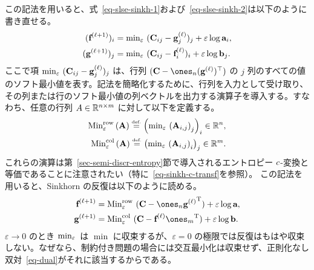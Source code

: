 \begin{rem}[ソフト最小値による書き換え]
この記法を用いると、式~\eqref{eq-slse-sinkh-1}および~\eqref{eq-slse-sinkh-2}は以下のように書き直せる。
\begin{align}
\label{eq-slse-smin-1}(\mathrm{\textbf{f}}^{(\ell+1)})_i &= \text{min}_\varepsilon\,\, (\mathrm{\textbf{C}}_{ij}-\mathrm{\textbf{g}}^{(\ell)}_j)_j + \varepsilon \log \mathrm{\textbf{a}}_i, \\
\label{eq-slse-smin-2}(\mathrm{\textbf{g}}^{(\ell+1)})_j &= \text{min}_\varepsilon\,\, (\mathrm{\textbf{C}}_{ij}-\mathrm{\textbf{f}}^{(\ell)}_i)_i + \varepsilon \log \mathrm{\textbf{b}}_j.
\end{align}
ここで項 $\text{min}_\varepsilon\,\, (\mathrm{\textbf{C}}_{ij}-\mathrm{\textbf{g}}^{(\ell)}_j)_j$ は、行列 $(\C-\ones_n (\it{\gD})^\top )$ の $j$ 列のすべての値のソフト最小値を表す。記法を簡略化するために、行列を入力として受け取り、その列または行のソフト最小値の列ベクトルを出力する演算子を導入する。すなわち、任意の行列 $A\in\mathbb{R}^{n\times m}$ に対して以下を定義する。
\begin{align*}
	\text{Min}^{\text{row}}_\varepsilon\,(\mathrm{\textbf{A}}) \stackrel{\mbox{\upshape\tiny def.}}{=} \left( \text{min}_\varepsilon\, \left( \mathrm{\textbf{A}}_{i,j} \right)_j \right)_i\in\mathbb{R}^n,\\
	\text{Min}^{\text{col}}_\varepsilon\,(\mathrm{\textbf{A}}) \stackrel{\mbox{\upshape\tiny def.}}{=} \left( \text{min}_\varepsilon\, \left( \mathrm{\textbf{A}}_{i,j} \right)_i \right)_j\in\mathbb{R}^m.
\end{align*}
これらの演算は第~\ref{sec-semi-discr-entropy}節で導入されるエントロピー $c$-変換と等価であることに注意されたい（特に~\eqref{eq-sinkh-c-transf}を参照）。
この記法を用いると、Sinkhorn の反復は以下のように読める。
\begin{align}
	\label{eq-lse-dual-1}\itt{\fD} &= \SMINEr\, (\C-\ones_n\transp{\it{\gD}}) + \varepsilon \log \a, \\
	\label{eq-lse-dual-2}\itt{\gD} &= \SMINEc\, (\C-\it{\fD}\transp{\ones_m})  + \varepsilon \log \b.
\end{align}
$\varepsilon \rightarrow 0$ のとき $\text{min}_\varepsilon\,$ は $\min$ に収束するが、$\varepsilon=0$ の極限では反復はもはや収束しない。なぜなら、制約付き問題の場合には交互最小化は収束せず、正則化なし双対~\eqref{eq-dual}がそれに該当するからである。
\end{rem}



